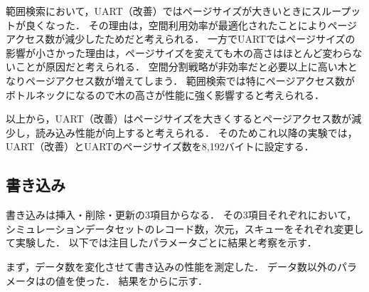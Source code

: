 範囲検索において，UART（改善）ではページサイズが大きいときにスループットが良くなった．
その理由は，空間利用効率が最適化されたことによりページアクセス数が減少したためだと考えられる．
一方でUARTではページサイズの影響が小さかった理由は，ページサイズを変えても木の高さはほとんど変わらないことが原因だと考えられる．
空間分割戦略が非効率だと必要以上に高い木となりページアクセス数が増えてしまう．
範囲検索では特にページアクセス数がボトルネックになるので木の高さが性能に強く影響すると考えられる．

以上から，UART（改善）はページサイズを大きくするとページアクセス数が減少し，読み込み性能が向上すると考えられる．
そのためこれ以降の実験では，UART（改善）とUARTのページサイズ数を8,192バイトに設定する．

\subsection{書き込み}

書き込みは挿入・削除・更新の3項目からなる．
その3項目それぞれにおいて，シミュレーションデータセットのレコード数，次元，スキューをそれぞれ変更して実験した．
以下では注目したパラメータごとに結果と考察を示す．

まず，データ数を変化させて書き込みの性能を測定した．
データ数以外のパラメータは\Tab{\ref{tab:rec}}の値を使った．
結果を\Fig{\ref{graph:rec-ins-2-0}}から\Fig{\ref{graph:rec-upd-8-0.5}}に示す．

